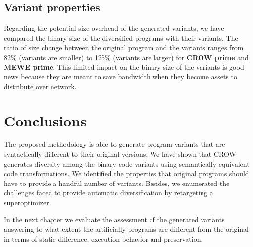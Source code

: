 
%




\subsection{Variant properties}

Regarding the potential size overhead of the generated variants, we have compared the \wasm binary size of the diversified programs with their variants. The ratio of size change between the original program and the variants ranges from 82\% (variants are smaller) to 125\% (variants are larger) for \textbf{CROW prime} and \textbf{MEWE prime}. This limited impact on the binary size of the variants is good news because they are meant to save bandwidth when they become assets to distribute over network.

\pagebreak
\section{Conclusions}

The proposed methodology is able to generate program variants that are syntactically different to their original versions. We have shown that CROW generates diversity among the binary code variants using semantically equivalent code transformations. We identified the properties that original programs should have to provide a handful number of variants. Besides, we enumerated the challenges faced to provide automatic diversification by retargeting a superoptimizer.

In the next chapter we evaluate the assessment of the generated variants answering to what extent the artificially programs are different from the original in terms of static difference, execution behavior and preservation.

\let\cleardoublepage\clearpage